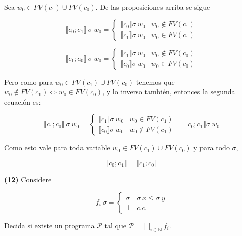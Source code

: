 \documentclass[a4paper, 12pt]{article}
\begin{document}
Sea $w_0 \in FV(c_1) \cup FV(c_0)$. De las proposiciones arriba se sigue

\begin{equation*}
  \llbracket c_0;c_1 \rrbracket ~ \sigma ~ w_0 = \begin{cases}
    \llbracket c_0 \rrbracket\sigma ~ w_0 & w_0 \not\in FV(c_1) \\ 
    \llbracket c_1 \rrbracket \sigma ~ w_0 & w_0 \in FV(c_1)
  \end{cases}
\end{equation*}

\begin{equation*}
  \llbracket c_1;c_0 \rrbracket ~ \sigma ~ w_0 = \begin{cases}
    \llbracket c_1 \rrbracket\sigma ~ w_0 & w_0 \not\in FV(c_0) \\ 
    \llbracket c_0 \rrbracket \sigma ~ w_0 & w_0 \in FV(c_0)
  \end{cases}
\end{equation*}

Pero como para $w_0 \in FV(c_1) \cup FV(c_0)$ tenemos que 
$w_0 \not\in FV(c_1) \iff w_0 \in FV(c_0)$, y lo inverso también, entonces
la segunda ecuación es:


\begin{equation*}
  \llbracket c_1;c_0 \rrbracket ~ \sigma ~ w_0 = \begin{cases}
    \llbracket c_1 \rrbracket\sigma ~ w_0 & w_0 \in FV(c_1) \\ 
    \llbracket c_0 \rrbracket \sigma ~ w_0 & w_0 \not\in FV(c_1)
  \end{cases} = \llbracket c_0;c_1 \rrbracket \sigma ~ w_0
\end{equation*}

Como esto vale para toda variable $w_0 \in FV(c_1) \cup FV(c_0)$ y para
todo $\sigma$, 

\begin{equation*}
  \llbracket c_0;c_1 \rrbracket = \llbracket c_1;c_0 \rrbracket
\end{equation*}

\pagebreak 

\begin{myframe}
  \textbf{(12)} Considere 

  \begin{equation*}
    f_i ~ \sigma = \begin{cases}
      \sigma & \sigma ~ x \leq \sigma ~ y \\ 
      \bot  & c.c.
    \end{cases}
  \end{equation*}

  Decida si existe un programa $\mathcal{P}$ tal que $\mathcal{P} = \bigsqcup_{i
  \in \mathbb{N}} f_i$.
\end{myframe}
\end{document}
